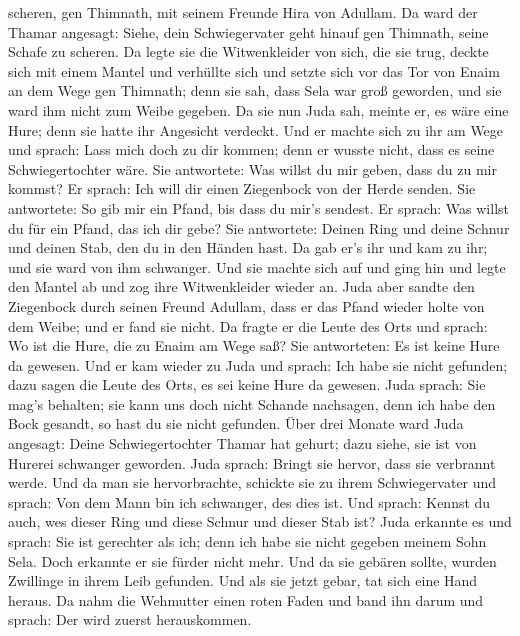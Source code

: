 scheren, gen Thimnath, mit seinem Freunde Hira von Adullam.
 Da ward der Thamar angesagt: Siehe, dein Schwiegervater
geht hinauf gen Thimnath, seine Schafe zu scheren.  Da
legte sie die Witwenkleider von sich, die sie trug, deckte sich mit
einem Mantel und verhüllte sich und setzte sich vor das Tor von Enaim an
dem Wege gen Thimnath; denn sie sah, dass Sela war groß geworden, und
sie ward ihm nicht zum Weibe gegeben.  Da sie nun Juda sah,
meinte er, es wäre eine Hure; denn sie hatte ihr Angesicht verdeckt.
 Und er machte sich zu ihr am Wege und sprach: Lass mich
doch zu dir kommen; denn er wusste nicht, dass es seine Schwiegertochter
wäre. Sie antwortete: Was willst du mir geben, dass du zu mir kommst?
 Er sprach: Ich will dir einen Ziegenbock von der Herde
senden. Sie antwortete: So gib mir ein Pfand, bis dass du mir's sendest.
 Er sprach: Was willst du für ein Pfand, das ich dir gebe?
Sie antwortete: Deinen Ring und deine Schnur und deinen Stab, den du in
den Händen hast. Da gab er's ihr und kam zu ihr; und sie ward von ihm
schwanger.  Und sie machte sich auf und ging hin und legte
den Mantel ab und zog ihre Witwenkleider wieder an.  Juda
aber sandte den Ziegenbock durch seinen Freund Adullam, dass er das
Pfand wieder holte von dem Weibe; und er fand sie nicht. 
Da fragte er die Leute des Orts und sprach: Wo ist die Hure, die zu
Enaim am Wege saß? Sie antworteten: Es ist keine Hure da gewesen.
 Und er kam wieder zu Juda und sprach: Ich habe sie nicht
gefunden; dazu sagen die Leute des Orts, es sei keine Hure da gewesen.
 Juda sprach: Sie mag's behalten; sie kann uns doch nicht
Schande nachsagen, denn ich habe den Bock gesandt, so hast du sie nicht
gefunden.  Über drei Monate ward Juda angesagt: Deine
Schwiegertochter Thamar hat gehurt; dazu siehe, sie ist von Hurerei
schwanger geworden. Juda sprach: Bringt sie hervor, dass sie verbrannt
werde.  Und da man sie hervorbrachte, schickte sie zu ihrem
Schwiegervater und sprach: Von dem Mann bin ich schwanger, des dies ist.
Und sprach: Kennst du auch, wes dieser Ring und diese Schnur und dieser
Stab ist?  Juda erkannte es und sprach: Sie ist gerechter
als ich; denn ich habe sie nicht gegeben meinem Sohn Sela. Doch erkannte
er sie fürder nicht mehr.  Und da sie gebären sollte,
wurden Zwillinge in ihrem Leib gefunden.  Und als sie jetzt
gebar, tat sich eine Hand heraus. Da nahm die Wehmutter einen roten
Faden und band ihn darum und sprach: Der wird zuerst herauskommen.

